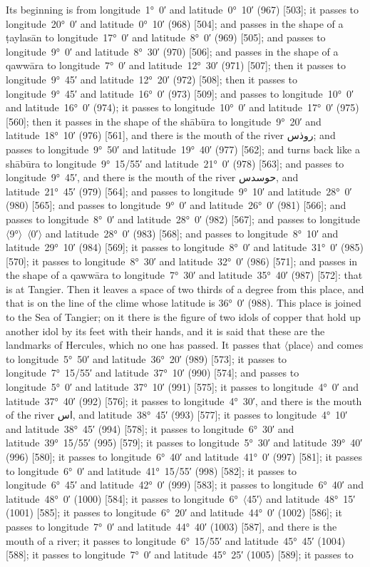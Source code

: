 \documentclass[11pt]{article}
\newcommand{\Pg}[1]{\marginpar{\footnotesize #1}}
\newcommand{\Ang}[1]{\ensuremath{#1}}
\begin{document}
Its beginning is from longitude~1°~0′ and latitude~0°~10′ (967) [503]; it passes to longitude~20°~0′ and latitude~0°~10′ (968) [504]; and passes in the shape of a ṭaylasān to longitude~17°~0′ and latitude~8°~0′ (969) [505]; and passes to longitude~9°~0′ and latitude~8°~30′ (970) [506]; and passes in the shape of a qawwāra to longitude~7°~0′ and latitude~12°~30′ (971) [507]; then it passes to longitude~9°~45′ and latitude~12°~20′ (972) [508]; then it passes to longitude~9°~45′ and latitude~16°~0′ (973) [509]; and passes to longitude~10°~0′ and latitude~16°~0′ (974); it passes to longitude~10°~0′ and latitude~17°~0′ (975) [560]; then it passes in the shape of the shābūra to longitude~9°~20′ and latitude~18°~10′ (976) [561], and there is the mouth of the river \textarabic{روذس}; and passes to longitude~9°~50′ and latitude~19°~40′ (977) [562]; and turns back like a shābūra to longitude~9°~15/55′ and latitude~21°~0′ (978) [563]; and passes to longitude~9°~45′, and there is the mouth of the river \textarabic{حوسدس}, and latitude~21°~45′ (979) [564]; and passes to longitude~9°~10′ and latitude~28°~0′ (980) [565]; and passes to longitude~9°~0′ and latitude~26°~0′ (981) [566]; and passes to longitude~8°~0′ and latitude~28°~0′ (982) [567]; and passes to longitude~\Ang{\langle}9°\Ang{\rangle}~\Ang{\langle}0′\Ang{\rangle} and latitude~28°~0′ (983) [568]\Pg{p. 67}; and passes to longitude~8°~10′ and latitude~29°~10′ (984) [569]; it passes to longitude~8°~0′ and latitude~31°~0′ (985) [570]; it passes to longitude~8°~30′ and latitude~32°~0′ (986) [571]; and passes in the shape of a qawwāra to longitude~7°~30′ and latitude~35°~40′ (987) [572]: that is at Tangier. Then it leaves a space of two thirds of a degree from this place, and that is on the line of the clime whose latitude is 36°~0′ (988). This place is joined to the Sea of Tangier; on it there is the figure of two idols of copper that hold up another idol by its feet with their hands, and it is said that these are the landmarks of Hercules, which no one has passed. It passes that \Ang{\langle}place\Ang{\rangle} and comes to longitude~5°~50′ and latitude~36°~20′ (989) [573]; it passes to longitude~7°~15/55′ and latitude~37°~10′ (990) [574]; and passes to longitude~5°~0′ and latitude~37°~10′ (991) [575]; it passes to longitude~4°~0′ and latitude~37°~40′ (992) [576]; it passes to longitude~4°~30′, and there is the mouth of the river \textarabic{اس}, and latitude~38°~45′ (993) [577]; it passes to longitude~4°~10′ and latitude~38°~45′ (994) [578]; it passes to longitude~6°~30′ and latitude~39°~15/55′ (995) [579]; it passes to longitude~5°~30′ and latitude~39°~40′ (996) [580]; it passes to longitude~6°~40′ and latitude~41°~0′ (997) [581]; it passes to longitude~6°~0′ and latitude~41°~15/55′ (998) [582]; it passes to longitude~6°~45′ and latitude~42°~0′ (999) [583]; it passes to longitude~6°~40′ and latitude~48°~0′ (1000) [584]; it passes to longitude~6°~\Ang{\langle}45′\Ang{\rangle} and latitude~48°~15′ (1001) [585]; it passes to longitude~6°~20′ and latitude~44°~0′ (1002) [586]\Pg{p. 68}; it passes to longitude~7°~0′ and latitude~44°~40′ (1003) [587], and there is the mouth of a river; it passes to longitude~6°~15/55′ and latitude~45°~45′ (1004) [588]; it passes to longitude~7°~0′ and latitude~45°~25′ (1005) [589]; it passes to 
\end{document}
